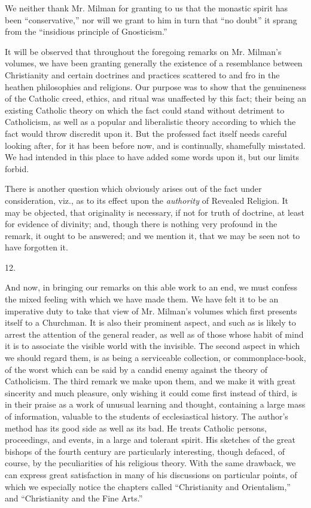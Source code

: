 We neither thank Mr. Milman for granting to us
that the monastic spirit has been ``conservative,'' nor will we grant to
him in turn that ``no doubt'' it sprang from the ``insidious principle of
Gnosticism.''

It will be observed that throughout the foregoing
remarks on Mr. Milman's volumes, we have been granting generally the
existence of a resemblance between Christianity and certain
doctrines and practices scattered to and fro in the heathen
philosophies and religions. Our purpose was to show that the
genuineness of the Catholic creed, ethics, and ritual was unaffected
by this fact; their being an existing Catholic theory on which the
fact could stand without detriment to Catholicism, as well as a
popular and liberalistic theory according to which the fact would
throw discredit upon it. But the professed fact itself needs careful
looking after, for it has been before now, and is continually,
shamefully misstated. We had intended in this place to have added some
words upon it, but our limits forbid.

There is another question which obviously arises
out of the fact under consideration, viz., as to its effect upon the \emph{authority}
of Revealed Religion. It may be objected, that originality is
necessary, if not for truth of doctrine, at least for evidence of
divinity; and, though there is nothing very profound in the remark, it
ought to be answered; and we mention it, that we may be seen not to
have forgotten it.

12.

And now, in bringing our remarks on this able
work to an end, we must confess the mixed feeling with which we have
made them. We have felt it to be an imperative duty to take that view
of Mr. Milman's volumes which first presents itself to a Churchman. It
is also their prominent aspect, and such as is likely to arrest the
attention of the general reader, as well as of those whose habit of
mind it is to associate the visible world with the invisible. The
second aspect in which we should regard them, is as being a
serviceable collection, or commonplace-book, of the worst which can be
said by a candid enemy against the theory of Catholicism. The
third remark we make upon them, and we make it with great sincerity
and much pleasure, only wishing it could come first instead of third,
is in their praise as a work of unusual learning and thought,
containing a large mass of information, valuable to the students of
ecclesiastical history. The author's method has its good side as well
as its bad. He treats Catholic persons, proceedings, and events, in a
large and tolerant spirit. His sketches of the great bishops of the
fourth century are particularly interesting, though defaced, of
course, by the peculiarities of his religious theory. With the same
drawback, we can express great satisfaction in many of his discussions
on particular points, of which we especially notice the chapters
called ``Christianity and Orientalism,'' and ``Christianity and the Fine
Arts.''

